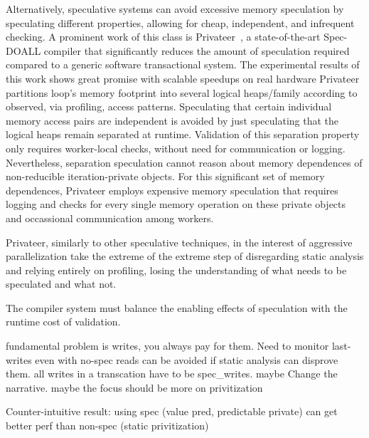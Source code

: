 Alternatively, speculative systems can avoid excessive memory speculation by
speculating different properties, allowing for cheap, independent, and
infrequent checking.
%
A prominent work of this class is Privateer~\cite{johnson:12:pldi:short}, a
state-of-the-art Spec-DOALL compiler that significantly reduces the amount of
speculation required compared to a generic software transactional system.
%
The experimental results of this work shows great promise with scalable speedups
on real hardware
%
Privateer partitions loop's memory footprint into several logical heaps/family
according to observed, via profiling, access patterns. Speculating that certain
individual memory access pairs are independent is avoided by just speculating
that the logical heaps remain separated at runtime. Validation of this
separation property only requires worker-local checks, without need for
communication or logging. Nevertheless, separation speculation cannot reason
about memory dependences of non-reducible iteration-private objects. For this
significant set of memory dependences, Privateer employs expensive memory
speculation that requires logging and checks for every single memory operation
on these private objects and occassional communication among workers.

Privateer, similarly to other speculative techniques, in the interest of
aggressive parallelization take the extreme of the extreme step of disregarding
static analysis and relying entirely on profiling, losing the understanding of
what needs to be speculated and what not.

The compiler system must balance the enabling effects of speculation with the
runtime cost of validation.

fundamental problem is writes, you always pay for them.
Need to monitor last-writes even with no-spec
reads can be avoided if static analysis can disprove them.
all writes in a transcation have to be spec_writes.
maybe Change the narrative.
maybe the focus should be more on privitization

Counter-intuitive result: using spec (value pred, predictable private) can get
better perf than non-spec (static privitization)



